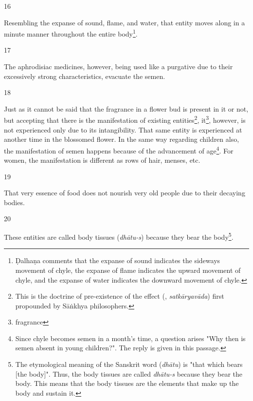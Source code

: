 \begin{translation}
\begin{sloka}


\end{sloka}

\item[16]

Resembling the expanse of sound, flame, and water, that entity moves along in a minute manner throughout the  entire body\footnote{Ḍalhaṇa comments \citep[63]{vulgate} that the expanse of sound indicates the sideways movement of chyle, the expanse of flame indicates the upward movement of chyle, and the expanse of water indicates the downward movement of chyle.}.

\item[17]

The aphrodisiac medicines, however, being used like a purgative due to their excessively strong characteristics, evacuate the semen.      

\item[18]

Just as it cannot be said that the fragrance in a flower bud is present in it or not, but accepting that there is the manifestation of existing entities\footnote{This is the doctrine of pre-existence of the effect (, \textit{satkāryavāda}) first propounded by Sāṅkhya philosophers.}, it\footnote{fragrance}, however, is not experienced only due to its intangibility. That same entity is experienced at another time in the blossomed flower. In the same way regarding children also, the manifestation of semen happens because of the advancement of age\footnote{Since chyle becomes semen in a month's time, a question arises "Why then is semen absent in young children?". The reply is given in this passage.}. For women, the manifestation is different as rows of hair, menses, etc. 

\item[19]

That very essence of food does not nourish very old people due to their decaying bodies.

\item[20]

These entities are called body tissues (\emph{dhātu-s}) because they bear the body\footnote{The etymological meaning of the Sanskrit word  (\emph{dhātu}) is "that which bears [the body]". Thus, the body tissues are called \emph{dhātu-s} because they bear the body. This means that the body tissues are the elements that make up the body and sustain it.}. 


\end{translation}
